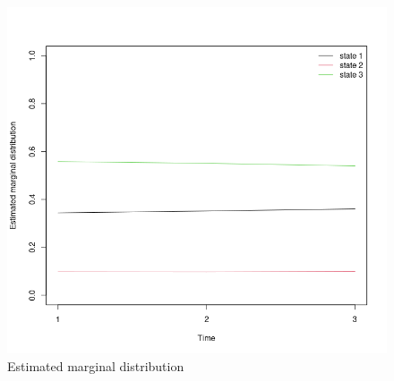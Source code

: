 \begin{figure}[htp]
    \centering
    \includegraphics[width=13cm]{output/emd_plot.png}
    \caption{Estimated marginal distribution}
        \label{fig:emd}
\end{figure}



